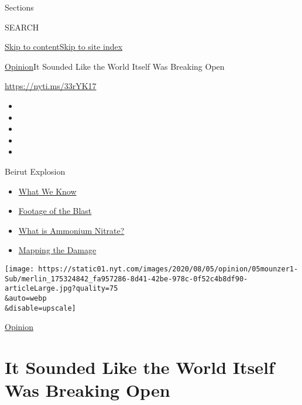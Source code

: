 Sections

SEARCH

\protect\hyperlink{site-content}{Skip to
content}\protect\hyperlink{site-index}{Skip to site index}

\href{/section/opinion}{Opinion}\textbar{}It Sounded Like the World
Itself Was Breaking Open

\href{https://nyti.ms/33rYK17}{https://nyti.ms/33rYK17}

\begin{itemize}
\item
\item
\item
\item
\item
\end{itemize}

Beirut Explosion

\begin{itemize}
\tightlist
\item
  \href{https://www.nytimes.com/2020/08/05/world/middleeast/beirut-explosion-what-happened.html?action=click\&pgtype=Article\&state=default\&region=TOP_BANNER\&context=storylines_menu}{What
  We Know}
\item
  \href{https://www.nytimes.com/2020/08/05/video/beirut-explosion-footage.html?action=click\&pgtype=Article\&state=default\&region=TOP_BANNER\&context=storylines_menu}{Footage
  of the Blast}
\item
  \href{https://www.nytimes.com/2020/08/05/world/middleeast/beirut-explosion-ammonium-nitrate.html?action=click\&pgtype=Article\&state=default\&region=TOP_BANNER\&context=storylines_menu}{What
  is Ammonium Nitrate?}
\item
  \href{https://www.nytimes.com/interactive/2020/08/04/world/middleeast/beirut-explosion-damage.html?action=click\&pgtype=Article\&state=default\&region=TOP_BANNER\&context=storylines_menu}{Mapping
  the Damage}
\end{itemize}

\texttt{[image: https://static01.nyt.com/images/2020/08/05/opinion/05mounzer1-Sub/merlin\_175324842\_fa957286-8d41-42be-978c-0f52c4b8df90-articleLarge.jpg?quality=75\\\&auto=webp\\\&disable=upscale]}

\href{/section/opinion}{Opinion}

\hypertarget{it-sounded-like-the-world-itself-was-breaking-open}{%
\section{It Sounded Like the World Itself Was Breaking
Open}\label{it-sounded-like-the-world-itself-was-breaking-open}}

